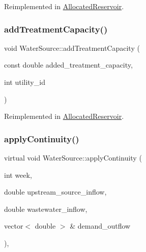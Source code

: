 Reimplemented in \mbox{\hyperlink{classAllocatedReservoir_ab4cd10b1a9b421309844bcec42899b70}{Allocated\+Reservoir}}.

\mbox{\label{classWaterSource_a210818957f088da4046597d0f1a1340f}} 
\subsubsection{\texorpdfstring{add\+Treatment\+Capacity()}{addTreatmentCapacity()}}
{\footnotesize\ttfamily void Water\+Source\+::add\+Treatment\+Capacity (\begin{DoxyParamCaption}\item[{const double}]{added\+\_\+treatment\+\_\+capacity,  }\item[{int}]{utility\+\_\+id }\end{DoxyParamCaption})\hspace{0.3cm}{\ttfamily [virtual]}}



Reimplemented in \mbox{\hyperlink{classAllocatedReservoir_ab781bee3253277f1dcfa4c12756d9d6f}{Allocated\+Reservoir}}.

\mbox{\label{classWaterSource_ac070445379fe706f65b977dade4f3fbc}} 
\subsubsection{\texorpdfstring{apply\+Continuity()}{applyContinuity()}}
{\footnotesize\ttfamily virtual void Water\+Source\+::apply\+Continuity (\begin{DoxyParamCaption}\item[{int}]{week,  }\item[{double}]{upstream\+\_\+source\+\_\+inflow,  }\item[{double}]{wastewater\+\_\+inflow,  }\item[{vector$<$ double $>$ \&}]{demand\+\_\+outflow }\end{DoxyParamCaption})\hspace{0.3cm}{\ttfamily [protected]}, {}}



